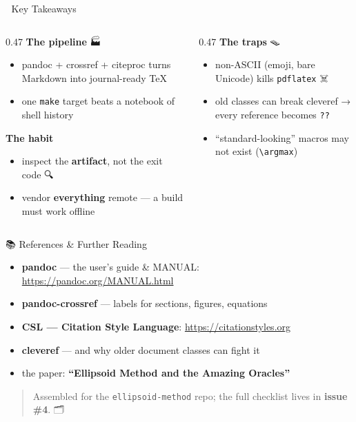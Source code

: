\documentclass[
  10pt,
  ignorenonframetext,
  serif,
  aspectratio=169]{beamer}
\providecommand{\tightlist}{%
  \setlength{\itemsep}{0pt}\setlength{\parskip}{0pt}}
\begin{document}
\begin{frame}[fragile]{🎯 Key Takeaways}
\protect{}\label{key-takeaways}
\begin{columns}[T]
\begin{column}{0.47\linewidth}
\textbf{The pipeline} 🏭

\begin{itemize}
\tightlist
\item
  pandoc + crossref + citeproc turns Markdown into journal-ready TeX 📕
\item
  one \texttt{make} target beats a notebook of shell history 📓
\end{itemize}

\textbf{The habit} 🧠

\begin{itemize}
\tightlist
\item
  inspect the \textbf{artifact}, not the exit code 🔍
\item
  vendor \textbf{everything} remote --- a build must work offline 📴
\end{itemize}
\end{column}

\begin{column}{0.47\linewidth}
\textbf{The traps} 🪤

\begin{itemize}
\tightlist
\item
  non-ASCII (emoji, bare Unicode) kills \texttt{pdflatex} ☠️
\item
  old classes can break cleveref → every reference becomes \texttt{??}
  🧩
\item
  ``standard-looking'' macros may not exist
  (\texttt{\textbackslash{}argmax}) 🐛
\end{itemize}
\end{column}
\end{columns}
\end{frame}

\begin{frame}[fragile]{📚 References \& Further Reading}
\protect{}\label{references-further-reading}
\begin{itemize}
\tightlist
\item
  \textbf{pandoc} --- the user's guide \& MANUAL:
  \url{https://pandoc.org/MANUAL.html} 📖
\item
  \textbf{pandoc-crossref} --- labels for sections, figures, equations
  🔗
\item
  \textbf{CSL --- Citation Style Language}:
  \url{https://citationstyles.org} 🎨
\item
  \textbf{cleveref} --- and why older document classes can fight it 🧩
\item
  the paper: \textbf{``Ellipsoid Method and the Amazing Oracles''} 📕
\end{itemize}

\begin{quote}
Assembled for the \texttt{ellipsoid-method} repo; the full checklist
lives in \textbf{issue \#4}. 🗂️
\end{quote}
\end{frame}
\end{document}
